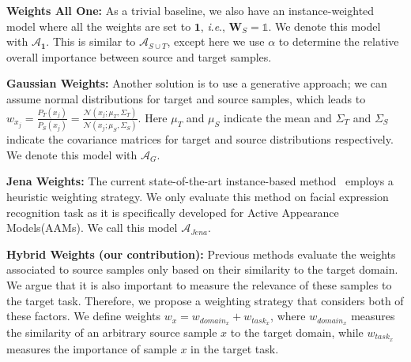 \documentclass{article}
\newcommand{\ie}{\textit{i}.\textit{e}., }
\begin{document}
\vspace{-.05cm}
\textbf{Weights All One:} 
As a trivial baseline, we also have an instance-weighted model where all the weights are set to $\mathbf{1}$, \ie $\mathbf{W}_S = \mathds{1}$. We denote this model with $\mathcal{A}_\mathbf{1}$. This is similar to $\mathcal{A}_{S\cup T}$, except here we use $\alpha$ to determine the relative overall importance between source and target samples.

\vspace{-.05cm}
\textbf{Gaussian Weights:}
Another solution is to use a generative approach; we can assume normal distributions for target and source samples, which leads to \mbox{$w_{x_j} = \frac{P_T(x_j)}{P_S(x_j)} = \frac{\mathcal{N}(x_j;\mu_T,\Sigma_T)}{\mathcal{N}(x_j;\mu_S,\Sigma_S)}$}. Here $\mu_T$ and $\mu_S $ indicate the mean and $\Sigma_T$ and $\Sigma_S$ indicate the covariance matrices for target and source distributions respectively. We denote this model with $\mathcal{A}_G$.

\vspace{-.05cm}
\textbf{Jena Weights:} The current state-of-the-art instance-based method~\cite{haase2014instance} employs a heuristic weighting strategy. We only evaluate this method on facial expression recognition task as it is specifically developed for Active Appearance Models(AAMs). We call this model $\mathcal{A}_{Jena}$.

\vspace{-.05cm}
\textbf{Hybrid Weights (our contribution):}
Previous methods evaluate the weights associated to source samples only based on their similarity to the target domain. We argue that it is also important to measure the relevance of these samples to the target task. Therefore, we propose a weighting strategy that considers both of these factors. We define weights $w_{x}=w_{domain_x} + w_{task_x}$, where $w_{domain_x}$ measures the similarity of an arbitrary source sample $x$ to the target domain, while $w_{task_x}$ measures the importance of sample $x$ in the target task.
\end{document}
